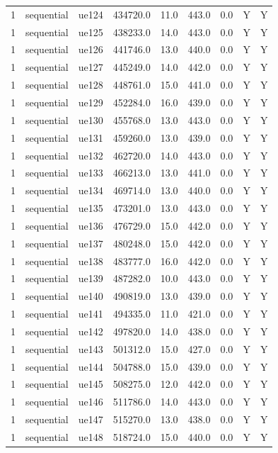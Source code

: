\begin{table}[ht]
\begin{tabular}{|c|c|c|c|c|c|c|c|c|}
1 & sequential & ue124 & 434720.0 & 11.0 & 443.0 & 0.0 & Y & Y \\
1 & sequential & ue125 & 438233.0 & 14.0 & 443.0 & 0.0 & Y & Y \\
1 & sequential & ue126 & 441746.0 & 13.0 & 440.0 & 0.0 & Y & Y \\
1 & sequential & ue127 & 445249.0 & 14.0 & 442.0 & 0.0 & Y & Y \\
1 & sequential & ue128 & 448761.0 & 15.0 & 441.0 & 0.0 & Y & Y \\
1 & sequential & ue129 & 452284.0 & 16.0 & 439.0 & 0.0 & Y & Y \\
1 & sequential & ue130 & 455768.0 & 13.0 & 443.0 & 0.0 & Y & Y \\
1 & sequential & ue131 & 459260.0 & 13.0 & 439.0 & 0.0 & Y & Y \\
1 & sequential & ue132 & 462720.0 & 14.0 & 443.0 & 0.0 & Y & Y \\
1 & sequential & ue133 & 466213.0 & 13.0 & 441.0 & 0.0 & Y & Y \\
1 & sequential & ue134 & 469714.0 & 13.0 & 440.0 & 0.0 & Y & Y \\
1 & sequential & ue135 & 473201.0 & 13.0 & 443.0 & 0.0 & Y & Y \\
1 & sequential & ue136 & 476729.0 & 15.0 & 442.0 & 0.0 & Y & Y \\
1 & sequential & ue137 & 480248.0 & 15.0 & 442.0 & 0.0 & Y & Y \\
1 & sequential & ue138 & 483777.0 & 16.0 & 442.0 & 0.0 & Y & Y \\
1 & sequential & ue139 & 487282.0 & 10.0 & 443.0 & 0.0 & Y & Y \\
1 & sequential & ue140 & 490819.0 & 13.0 & 439.0 & 0.0 & Y & Y \\
1 & sequential & ue141 & 494335.0 & 11.0 & 421.0 & 0.0 & Y & Y \\
1 & sequential & ue142 & 497820.0 & 14.0 & 438.0 & 0.0 & Y & Y \\
1 & sequential & ue143 & 501312.0 & 15.0 & 427.0 & 0.0 & Y & Y \\
1 & sequential & ue144 & 504788.0 & 15.0 & 439.0 & 0.0 & Y & Y \\
1 & sequential & ue145 & 508275.0 & 12.0 & 442.0 & 0.0 & Y & Y \\
1 & sequential & ue146 & 511786.0 & 14.0 & 443.0 & 0.0 & Y & Y \\
1 & sequential & ue147 & 515270.0 & 13.0 & 438.0 & 0.0 & Y & Y \\
1 & sequential & ue148 & 518724.0 & 15.0 & 440.0 & 0.0 & Y & Y \\

\end{tabular}
\end{table}
